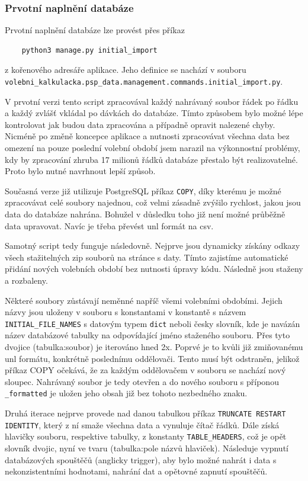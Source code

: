 \subsubsection{Prvotní naplnění databáze}
Prvotní naplnění databáze lze provést přes příkaz
\begin{verbatim}
    python3 manage.py initial_import
\end{verbatim}
z kořenového adresáře aplikace. Jeho definice se nachází v souboru\\
\texttt{volebni\_kalkulacka.psp\_data.management.commands.initial\_import.py}. \\

\par V prvotní verzi tento script zpracovával každý nahrávaný soubor řádek po řádku a každý zvlášť vkládal po dávkách do databáze. Tímto způsobem bylo možné lépe kontrolovat jak budou data zpracována a případně opravit nalezené chyby. Nicméně po změně koncepce aplikace a nutnosti zpracovávat všechna data bez omezení na pouze poslední volební období jsem narazil na výkonnostní problémy, kdy by zpracování zhruba 17 milionů řádků databáze přestalo být realizovatelné.
Proto bylo nutné navrhnout lepší způsob.

\par Současná verze již utilizuje PostgreSQL příkaz \texttt{COPY}, díky kterému je možné zpracovávat celé soubory najednou\cite{psql-copy}, což velmi zásadně zvýšilo rychlost, jakou jsou data do databáze nahrána. Bohužel v důsledku toho již není možné průběžně data upravovat. Navíc je třeba převést unl formát na csv.

\par Samotný script tedy funguje následovně. Nejprve jsou dynamicky získány odkazy všech stažitelných zip souborů na stránce s daty. Tímto zajistíme automatické přidání nových volebních období bez nutnosti úpravy kódu. Následně jsou staženy a rozbaleny. \\

\par Některé soubory zůstávají neměnné napříč všemi volebními obdobími. Jejich názvy jsou uloženy v souboru s konstantami v konstantě s názvem \texttt{INITIAL\_FILE\_NAMES} s datovým typem \texttt{dict} neboli česky slovník, kde je navázán název databázové tabulky na odpovídající jméno staženého souboru. Přes tyto dvojice (tabulka:soubor) je iterováno hned 2x. Poprvé je to kvůli již zmiňovanému unl formátu, konkrétně poslednímu oddělovači. Tento musí být odstraněn, jelikož příkaz COPY očekává, že za každým oddělovačem v souboru se nachází nový sloupec. Nahrávaný soubor je tedy otevřen a do nového souboru s příponou \texttt{\_formatted} je uložen jeho obsah již bez tohoto nezbedného znaku.
\par Druhá iterace nejprve provede nad danou tabulkou příkaz \texttt{TRUNCATE RESTART IDENTITY}, který z ní smaže všechna data a vynuluje čítač řádků\cite{psql-truncate}. Dále získá hlavičky souboru, respektive tabulky, z konstanty \texttt{TABLE\_HEADERS}, což je opět slovník dvojic, nyní ve tvaru (tabulka:pole názvů hlaviček). Následuje vypnutí databázových spouštěčů (anglicky trigger), aby bylo možné nahrát i data s nekonzistentními hodnotami, nahrání dat a opětovné zapnutí spouštěčů. 

